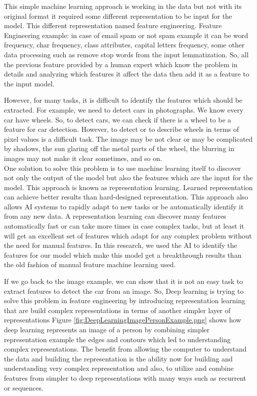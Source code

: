       This simple machine learning approach is working in the data but not with its original format it required some different representation to be input for the model. This different representation named feature engineering. Feature Engineering example: in case of email spam or not spam example it can be word frequency, char frequency, class attributes, capital letters frequency, some other data processing such as remove stop words from the input lemmatization. So, all the previous feature provided by a human expert which know the problem in details and analyzing which features it affect the data then add it as a feature to the input model.
      \newpage

      However, for many tasks, it is difficult to identify the features which should be extracted. For example, we need to detect cars in photographs. We know every car have wheels. So, to detect cars, we can check if there is a wheel to be a feature for car detection. However, to detect or to describe wheels in terms of pixel values is a difficult task. The image may be not clear or may be complicated by shadows, the sun glaring off the metal parts of the wheel, the blurring in images may not make it clear sometimes, and so on\cite{Goodfellow-et-al-2016}.\\

      One solution to solve this problem is to use machine learning itself to discover not only the output of the model but also the features which are the input for the model. This approach is known as representation learning. Learned representation can achieve better results than hard-designed representation. This approach also allows AI systems to rapidly adapt to new tasks or be automatically identify it from any new data. A representation learning can discover many features automatically fast or can take more times in case complex tasks, but at least it will get an excellent set of features which adapt for any complex problem without the need for manual features. In this research, we used the AI to identify the features for our model which make this model get a breakthrough results than the old fashion of manual feature machine learning used.

      If we go back to the image example, we can show that it is not an easy task to extract features to detect the car from an image. So, Deep learning is trying to solve this problem in feature engineering by introducing representation learning that are build complex representations in terms of another simpler layer of representations Figure \ref{fig:DeepLearningImagePersonExample.png} shows how deep learning represents an image of a person by combining simpler representation example the edges and contours which led to understanding complex representations. The benefit from allowing the computer to understand the data and building the representation is the ability now for building and understanding very complex representation and also, to utilize and combine features from simpler to deep representations with many ways such as recurrent or sequences.

